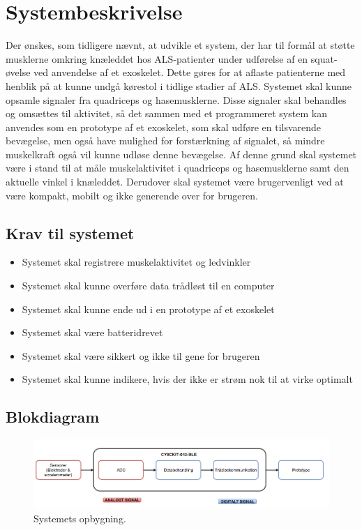 \section{Systembeskrivelse}
Der ønskes, som tidligere nævnt, at udvikle et system, der har til formål at støtte musklerne omkring knæleddet hos ALS-patienter under udførelse af en squat-øvelse ved anvendelse af et exoskelet. Dette gøres for at aflaste patienterne med henblik på at kunne undgå kørestol i tidlige stadier af ALS. Systemet skal kunne opsamle signaler fra quadriceps og hasemusklerne. Disse signaler skal behandles og omsættes til aktivitet, så det sammen med et programmeret system kan anvendes som en prototype af et exoskelet, som skal udføre en tilsvarende bevægelse, men også have mulighed for forstærkning af signalet, så mindre muskelkraft også vil kunne udløse denne bevægelse. Af denne grund skal systemet være i stand til at måle muskelaktivitet i quadriceps og hasemusklerne samt den aktuelle vinkel i knæleddet. Derudover skal systemet være brugervenligt ved at være kompakt, mobilt og ikke generende over for brugeren.

\subsection{Krav til systemet} 
\begin{itemize}
\item Systemet skal registrere muskelaktivitet og ledvinkler
\item Systemet skal kunne overføre data trådløst til en computer
\item Systemet skal kunne ende ud i en prototype af et exoskelet
\item Systemet skal være batteridrevet
\item Systemet skal være sikkert og ikke til gene for brugeren 
\item Systemet skal kunne indikere, hvis der ikke er strøm nok til at virke optimalt
\end{itemize}


\subsection{Blokdiagram} 
\begin{figure}[H]
\centering
\includegraphics[width=1\textwidth]{figures/blokdiagram.png}
\caption{Systemets opbygning.}
\label{fig:blokdiagram}
\end{figure}

